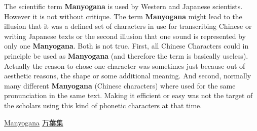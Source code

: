 The scientific term \textbf{Manyogana} is used by Western and Japanese
scientists. However it is not without critique. The term \textbf{Manyogana}
might lead to the illusion that it was a defined set of characters in use for
transcribing Chinese or writing Japanese texts or the second illusion that one
sound is represented by only  one \textbf{Manyogana}. Both is not true. First,
all Chinese Characters could in principle be used as \textbf{Manyogana} (and
therefore the term is basically useless). Actually the reason to chose one
character was sometimes just because out of aesthetic reasons, the shape or
some additional meaning. And second, normally many different \textbf{Manyogana}
(Chinese characters) where used for the same pronunciation in the same text.
Making it efficient or easy was not the target of the scholars using this kind
of \hyperref[sec:PhoneticCharacter]{phonetic characters} at that time.


\Link \href{http://en.wikipedia.org/wiki/Manyogana}{Manyogana}
\Link \href{http://en.wikipedia.org/wiki/Man%27y%C5%8Dsh%C5%AB}{万葉集}

